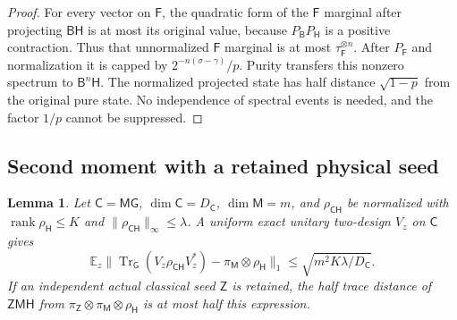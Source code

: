 \documentclass[11pt,a4paper]{article}
\numberwithin{equation}{section}
\theoremstyle{plain}
\newtheorem{lemma}[theorem]{Lemma}
\theoremstyle{definition}
\DeclareMathOperator{\Tr}{Tr}
\DeclareMathOperator{\rank}{rank}
\newcommand{\rg}[1]{\mathsf{#1}}
\begin{document}
\begin{proof}
For every vector on $\rg{F}$, the quadratic form of the $\rg{F}$ marginal
after projecting $\rg{B}\rg{H}$ is at most its original value, because
$P_{\rg{B}}P_{\rg{H}}$ is a positive contraction. Thus that unnormalized
$\rg{F}$ marginal is at most $\tau_{\rg{F}}^{\otimes n}$. After $P_{\rg{F}}$
and normalization it is capped by $2^{-n(\sigma-\gamma)}/p$. Purity transfers
this nonzero spectrum to $\rg{B}^n\rg{H}$. The normalized projected state has
half distance $\sqrt{1-p}$ from the original pure state. No independence of
spectral events is needed, and the factor $1/p$ cannot be suppressed.
\end{proof}

\subsection{Second moment with a retained physical seed}

\begin{lemma}
\label{lem:seed-decoupling}
Let $\rg{C}=\rg{M}\rg{G}$, $\dim\rg{C}=D_{\rg{C}}$, $\dim\rg{M}=m$, and
$\rho_{\rg{C}\rg{H}}$ be normalized with $\rank\rho_{\rg{H}}\le K$ and
$\lVert\rho_{\rg{C}\rg{H}}\rVert_\infty\le\lambda$. A uniform exact unitary
two-design $V_z$ on $\rg{C}$ gives
\[
\mathbb{E}_z\bigl\lVert\Tr_{\rg{G}}(V_z\rho_{\rg{C}\rg{H}}V_z^*)
-\pi_{\rg{M}}\otimes\rho_{\rg{H}}\bigr\rVert_1
\le\sqrt{m^2K\lambda/D_{\rg{C}}}.
\]
If an independent actual classical seed $\rg{Z}$ is retained, the half trace
distance of $\rg{Z}\rg{M}\rg{H}$ from
$\pi_{\rg{Z}}\otimes\pi_{\rg{M}}\otimes\rho_{\rg{H}}$ is at most half this
expression.
\end{lemma}
\end{document}
